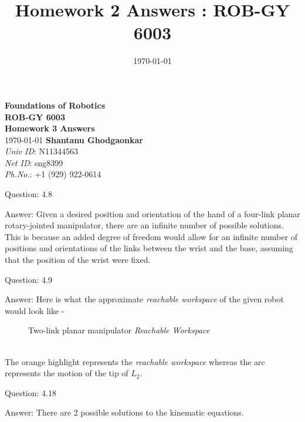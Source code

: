 \documentclass[a4paper]{article}
\title{Homework 2 Answers : ROB-GY 6003}
\author{\myName}
\date{\today}
\newcommand{\myName}{\textbf{Shantanu Ghodgaonkar}\\\textit{Univ ID}: N11344563\\\textit{Net ID}: sng8399\\\textit{Ph.No.}: +1 (929) 922-0614}
\begin{document}
	
	\begin{titlepage}
	    \centering
	    \vspace{2cm}
	    \Huge\textbf{Foundations of Robotics \\ ROB-GY 6003 \\ Homework 3 Answers}
	    \vspace{1cm}
	    \\ \Large \today
	    \vfill 
	    \Large \myName
	\end{titlepage}
	
	\begin{qalist}			
		\item[Question: 4.8] \setcounter{equation}{0} %
		\item[Answer:] Given a desired position and orientation of the hand of a four-link planar rotary-jointed manipulator, there are an infinite number of possible solutions. This is because an added degree of freedom would allow for an infinite number of positions and orientations of the links between the wrist and the base, assuming that the position of the wrist were fixed. 
			
		\item[Question: 4.9] \setcounter{equation}{0} %
		\item[Answer:] Here is what the approximate \textit{reachable workspace} of the given robot would look like - 
			\begin{figure}[h!]			
				\vspace{0.5cm}
				\centering
				\caption{Two-link planar manipulator \textit{Reachable Workspace}} 
				\label{fig:q4_9}
				\vspace{0.5cm}
			\end{figure}
		\\The orange highlight represents the \textit{reachable workspace} whereas the arc represents the motion of the tip of ${L}_{2}$.
		\item[Question: 4.18] \setcounter{equation}{0} %
		\item[Answer:] There are 2 possible solutions to the kinematic equations.
		

\end{qalist}
\end{document}
